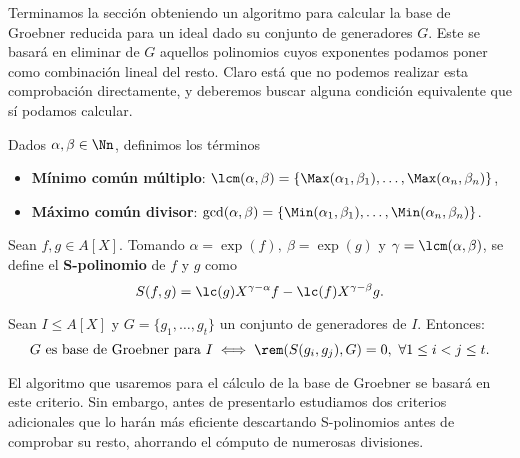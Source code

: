Terminamos la sección obteniendo un algoritmo para calcular la base de Groebner reducida para un ideal dado su conjunto de generadores $G$. Este se basará en eliminar de $G$ aquellos polinomios cuyos exponentes podamos poner como combinación lineal del resto. Claro está que no podemos realizar esta comprobación directamente, y deberemos buscar alguna condición equivalente que sí podamos calcular.

\begin{definicion}
    Dados $\alpha,\beta \in \Nn$, definimos los términos
    \begin{itemize}
        \item \textbf{Mínimo común múltiplo}: $\lcm(\alpha,\beta) = \{\Max(\alpha_1, \beta_1),\dots, \Max(\alpha_n, \beta_n)\}$,
        \item \textbf{Máximo común divisor}: $\gcd(\alpha,\beta) = \{\Min(\alpha_1, \beta_1),\dots, \Min(\alpha_n, \beta_n)\}$.
    \end{itemize}
\end{definicion}

\begin{definicion}
    Sean $f,g \in A[X]$. Tomando $\alpha=\exp(f),\ \beta=\exp(g)$ y $\gamma = \lcm(\alpha,\beta)$, se define el \textbf{S-polinomio} de $f$ y $g$ como
    \begin{equation*}
        S(f,g) = \lc(g)X^{\gamma-\alpha}f - \lc(f)X^{\gamma-\beta}g.
    \end{equation*}
\end{definicion}

\begin{teorema}\label{t:criterio}
    Sean $I\le A[X]$ y $G=\{g_1,\dots, g_t\}$ un conjunto de generadores de $I$. Entonces:
    \begin{equation*}
        G \text{ es base de Groebner para } I \iff \rem(S(g_i,g_j), G)=0,\ \forall 1\le i<j\le t.
    \end{equation*}
\end{teorema}

El algoritmo que usaremos para el cálculo de la base de Groebner se basará en este criterio. Sin embargo, antes de presentarlo estudiamos dos criterios adicionales \cite{criterio1} \cite{criterio2} que lo harán más eficiente descartando S-polinomios antes de comprobar su resto, ahorrando el cómputo de numerosas divisiones.

